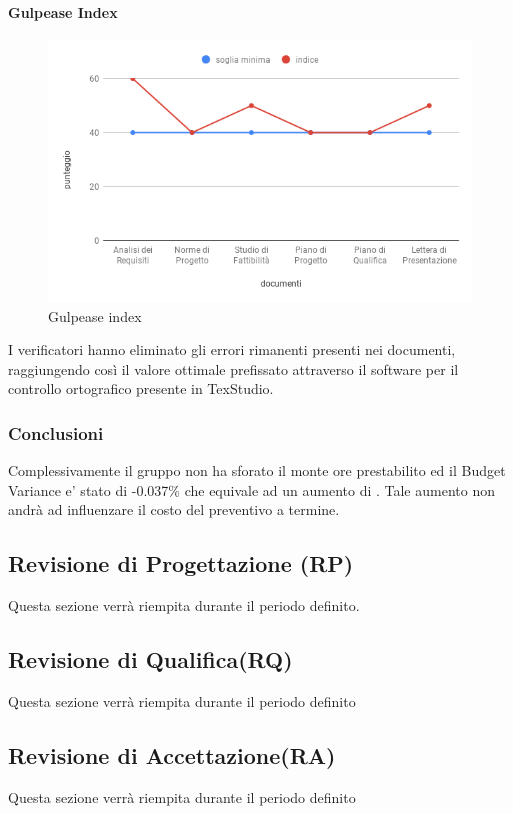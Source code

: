 \paragraph{Gulpease Index}
\hspace{15cm}
\begin{figure}[!htbp]
	\centering
	\includegraphics[scale=0.5]{GulpeaseIndex.png}
	\caption{Gulpease index}
\end{figure}

 I verificatori hanno eliminato gli errori rimanenti presenti nei documenti, raggiungendo così il valore ottimale prefissato attraverso il software per il controllo ortografico presente in TexStudio. 
 
\subsubsection{Conclusioni}
Complessivamente il gruppo non ha sforato il monte ore prestabilito ed il Budget Variance e' stato di -0.037\% che equivale ad un aumento di . Tale aumento non andrà ad influenzare il costo del preventivo a termine. 
\clearpage
\subsection{Revisione di Progettazione (RP)}
Questa sezione verrà riempita durante il periodo definito.
\subsection{Revisione di Qualifica(RQ)}
Questa sezione verrà riempita durante il periodo definito
\subsection{Revisione di Accettazione(RA)}
Questa sezione verrà riempita durante il periodo definito
